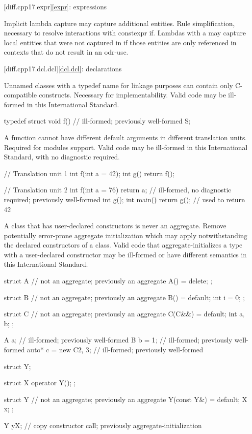 [diff.cpp17.expr]{\ref{expr}: expressions}

\change
Implicit lambda capture may capture additional entities.
\rationale
Rule simplification, necessary to resolve interactions with constexpr if.
\effect
Lambdas with a 
may capture local entities
that were not captured in \CppXVII{}
if those entities are only referenced in contexts
that do not result in an odr-use.

[diff.cpp17.dcl.dcl]{\ref{dcl.dcl}: declarations}

\change
Unnamed classes with a typedef name for linkage purposes
can contain only C-compatible constructs.
\rationale
Necessary for implementability.
\effect
Valid \CppXVII{} code may be ill-formed in this International Standard.
\begin{codeblock}
typedef struct {
  void f() {}           // ill-formed; previously well-formed
} S;
\end{codeblock}

\change
A function cannot have different default arguments
in different translation units.
\rationale
Required for modules support.
\effect
Valid \CppXVII{} code may be ill-formed in this International Standard,
with no diagnostic required.
\begin{codeblock}
// Translation unit 1
int f(int a = 42);
int g() { return f(); }

// Translation unit 2
int f(int a = 76) { return a; }         // ill-formed, no diagnostic required; previously well-formed
int g();
int main() { return g(); }              // used to return 42
\end{codeblock}

\change
A class that has user-declared constructors is never an aggregate.
\rationale
Remove potentially error-prone aggregate initialization
which may apply notwithstanding the declared constructors of a class.
\effect
Valid \CppXVII{} code that aggregate-initializes
a type with a user-declared constructor
may be ill-formed or have different semantics
in this International Standard.
\begin{codeblock}
struct A {              // not an aggregate; previously an aggregate
  A() = delete;
};

struct B {              // not an aggregate; previously an aggregate
  B() = default;
  int i = 0;
};

struct C {              // not an aggregate; previously an aggregate
  C(C&&) = default;
  int a, b;
};

A a{};                  // ill-formed; previously well-formed
B b = {1};              // ill-formed; previously well-formed
auto* c = new C{2, 3};  // ill-formed; previously well-formed

struct Y;

struct X {
  operator Y();
};

struct Y {              // not an aggregate; previously an aggregate
  Y(const Y&) = default;
  X x;
};

Y y{X{}};               // copy constructor call; previously aggregate-initialization
\end{codeblock}

